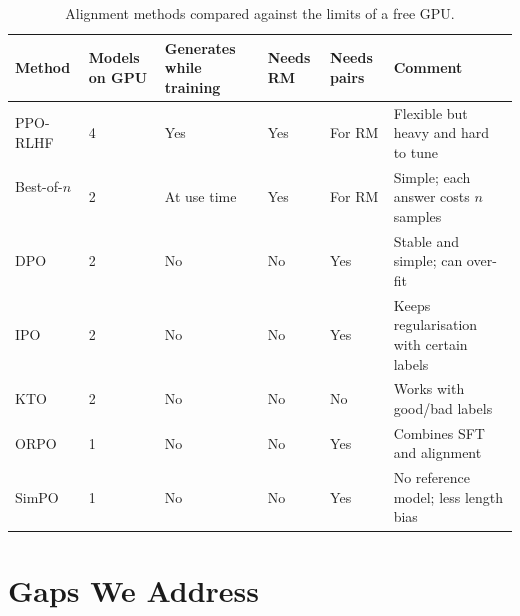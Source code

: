\begin{table}[!htbp]
\centering
\caption[Comparison of alignment methods]{Alignment methods compared against the limits of a free GPU.}
\label{tab:lit-algos}
\footnotesize
\begin{tabularx}{\textwidth}{@{}L{2.5cm}C{1.3cm}C{1.9cm}C{1.1cm}C{1.2cm}Y@{}}
\toprule
\textbf{Method} & \textbf{Models on GPU} & \textbf{Generates while training} & \textbf{Needs RM} & \textbf{Needs pairs} & \textbf{Comment}\\
\midrule
PPO-RLHF~\cite{ouyang2022instructgpt} & 4 & Yes & Yes & For RM & Flexible but heavy and hard to tune\\
Best-of-$n$~\cite{nakano2021webgpt} & 2 & At use time & Yes & For RM & Simple; each answer costs $n$ samples\\
DPO~\cite{rafailov2023dpo} & 2 & No & No & Yes & Stable and simple; can over-fit\\
IPO~\cite{azar2024ipo} & 2 & No & No & Yes & Keeps regularisation with certain labels\\
KTO~\cite{ethayarajh2024kto} & 2 & No & No & No & Works with good/bad labels\\
ORPO~\cite{hong2024orpo} & 1 & No & No & Yes & Combines SFT and alignment\\
SimPO~\cite{meng2024simpo} & 1 & No & No & Yes & No reference model; less length bias\\
\bottomrule
\end{tabularx}
\end{table}

\section{Gaps We Address}
\label{sec:gaps}

